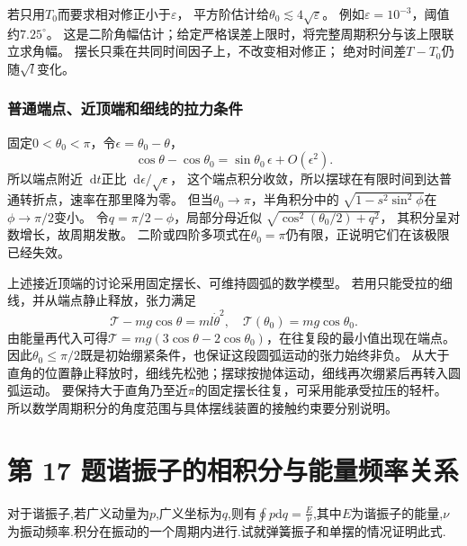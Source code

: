 \documentclass[UTF8,fontset=fandol,a4paper,11pt]{ctexart}
\newcommand{\dd}{\mathop{}\!\mathrm{d}}
\newcommand{\tagline}[1]{\noindent{\small\color{muted}#1}\par}
\begin{document}
若只用$T_0$而要求相对修正小于$\varepsilon$，
平方阶估计给$\theta_0\lesssim4\sqrt\varepsilon$。
例如$\varepsilon=10^{-3}$，阈值约$7.25^\circ$。
这是二阶角幅估计；给定严格误差上限时，将完整周期积分与该上限联立求角幅。
摆长只乘在共同时间因子上，不改变相对修正；
绝对时间差$T-T_0$仍随$\sqrt l$变化。

\subsubsection*{普通端点、近顶端和细线的拉力条件}
固定$0<\theta_0<\pi$，令$\epsilon=\theta_0-\theta$，
\[
\cos\theta-\cos\theta_0=\sin\theta_0\,\epsilon+O(\epsilon^2).
\]
所以端点附近$\dd t$正比$\dd\epsilon/\sqrt\epsilon$，
这个端点积分收敛，所以摆球在有限时间到达普通转折点，速率在那里降为零。
但当$\theta_0\to\pi$，半角积分中的
$\sqrt{1-s^2\sin^2\phi}$在$\phi\to\pi/2$变小。
令$q=\pi/2-\phi$，局部分母近似
$\sqrt{\cos^2(\theta_0/2)+q^2}$，
其积分呈对数增长，故周期发散。
二阶或四阶多项式在$\theta_0=\pi$仍有限，正说明它们在该极限已经失效。

上述接近顶端的讨论采用固定摆长、可维持圆弧的数学模型。
若用只能受拉的细线，并从端点静止释放，张力满足
\[
\mathcal T-mg\cos\theta=ml\dot\theta^2,
\quad\mathcal T(\theta_0)=mg\cos\theta_0.
\]
由能量再代入可得$\mathcal T=mg(3\cos\theta-2\cos\theta_0)$，在往复段的最小值出现在端点。
因此$\theta_0\le\pi/2$既是初始绷紧条件，也保证这段圆弧运动的张力始终非负。
从大于直角的位置静止释放时，细线先松弛；摆球按抛体运动，细线再次绷紧后再转入圆弧运动。
要保持大于直角乃至近$\pi$的固定摆长往复，可采用能承受拉压的轻杆。
所以数学周期积分的角度范围与具体摆线装置的接触约束要分别说明。




\section*{第 17 题\quad 谐振子的相积分与能量频率关系}

\tagline{M-07-17}

对于谐振子,若广义动量为\(p\),广义坐标为\(q\),则有\(\oint p\mathrm{d}q=\frac{E}{\nu}\),其中\(E\)为谐振子的能量,\(\nu\)为振动频率.积分在振动的一个周期内进行.试就弹簧振子和单摆的情况证明此式.
\end{document}
